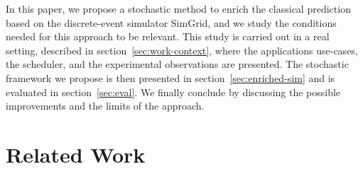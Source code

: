 \documentclass[10pt,conference,compsocconf]{IEEEtran}
\begin{document}
In this paper, we propose a stochastic method to enrich the classical prediction
based  on the  discrete-event simulator  SimGrid,  and we  study the  conditions
needed for  this approach to be  relevant. This study  is carried out in  a real
setting,  described in  section~\ref{sec:work-context},  where the  applications
use-cases, the scheduler, and the  experimental observations are presented.  The
stochastic     framework     we     propose     is     then     presented     in
section~\ref{sec:enriched-sim}  and is  evaluated in  section~\ref{sec:eval}. We
finally conclude by  discussing the possible improvements and the  limits of the
approach.


\section{Related Work}
\end{document}
